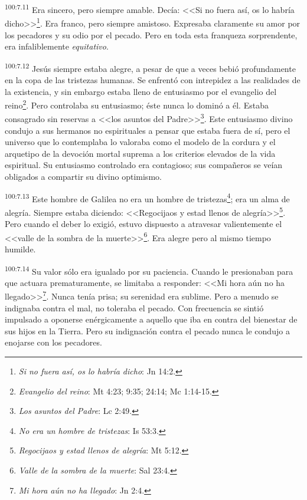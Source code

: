 \par
\textsuperscript{100:7.11} Era sincero, pero siempre amable. Decía: <<Si no fuera así, os lo habría dicho>>\footnote{\textit{Si no fuera así, os lo habría dicho}: Jn 14:2.}. Era franco, pero siempre amistoso. Expresaba claramente su amor por los pecadores y su odio por el pecado. Pero en toda esta franqueza sorprendente, era infaliblemente \textit{equitativo}.

\par
\textsuperscript{100:7.12} Jesús siempre estaba alegre, a pesar de que a veces bebió profundamente en la copa de las tristezas humanas. Se enfrentó con intrepidez a las realidades de la existencia, y sin embargo estaba lleno de entusiasmo por el evangelio del reino\footnote{\textit{Evangelio del reino}: Mt 4:23; 9:35; 24:14; Mc 1:14-15.}. Pero controlaba su entusiasmo; éste nunca lo dominó a él. Estaba consagrado sin reservas a <<los asuntos del Padre>>\footnote{\textit{Los asuntos del Padre}: Lc 2:49.}. Este entusiasmo divino condujo a sus hermanos no espirituales a pensar que estaba fuera de sí, pero el universo que lo contemplaba lo valoraba como el modelo de la cordura y el arquetipo de la devoción mortal suprema a los criterios elevados de la vida espiritual. Su entusiasmo controlado era contagioso; sus compañeros se veían obligados a compartir su divino optimismo.

\par
\textsuperscript{100:7.13} Este hombre de Galilea no era un hombre de tristezas\footnote{\textit{No era un hombre de tristezas}: Is 53:3.}; era un alma de alegría. Siempre estaba diciendo: <<Regocijaos y estad llenos de alegría>>\footnote{\textit{Regocijaos y estad llenos de alegría}: Mt 5:12.}. Pero cuando el deber lo exigió, estuvo dispuesto a atravesar valientemente el <<valle de la sombra de la muerte>>\footnote{\textit{Valle de la sombra de la muerte}: Sal 23:4.}. Era alegre pero al mismo tiempo humilde.

\par
\textsuperscript{100:7.14} Su valor sólo era igualado por su paciencia. Cuando le presionaban para que actuara prematuramente, se limitaba a responder: <<Mi hora aún no ha llegado>>\footnote{\textit{Mi hora aún no ha llegado}: Jn 2:4.}. Nunca tenía prisa; su serenidad era sublime. Pero a menudo se indignaba contra el mal, no toleraba el pecado. Con frecuencia se sintió impulsado a oponerse enérgicamente a aquello que iba en contra del bienestar de sus hijos en la Tierra. Pero su indignación contra el pecado nunca le condujo a enojarse con los pecadores.

